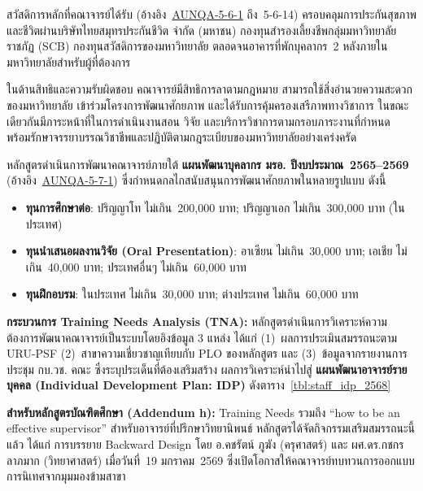 สวัสดิการหลักที่คณาจารย์ได้รับ (อ้างอิง~\hyperlink{ref:AUNQA-5-6-1}{AUNQA-5-6-1} ถึง~5-6-14) ครอบคลุมการประกันสุขภาพและชีวิตผ่านบริษัทไทยสมุทรประกันชีวิต จำกัด (มหาชน) กองทุนสำรองเลี้ยงชีพกลุ่มมหาวิทยาลัยราชภัฏ (SCB) กองทุนสวัสดิการของมหาวิทยาลัย ตลอดจนอาคารที่พักบุคลากร~2 หลังภายในมหาวิทยาลัยสำหรับผู้ที่ต้องการ

ในด้านสิทธิและความรับผิดชอบ คณาจารย์มีสิทธิการลาตามกฎหมาย สามารถใช้สิ่งอำนวยความสะดวกของมหาวิทยาลัย เข้าร่วมโครงการพัฒนาศักยภาพ และได้รับการคุ้มครองเสรีภาพทางวิชาการ ในขณะเดียวกันมีภาระหน้าที่ในการดำเนินงานสอน วิจัย และบริการวิชาการตามกรอบภาระงานที่กำหนด พร้อมรักษาจรรยาบรรณวิชาชีพและปฏิบัติตามกฎระเบียบของมหาวิทยาลัยอย่างเคร่งครัด



หลักสูตรดำเนินการพัฒนาคณาจารย์ภายใต้ \textbf{แผนพัฒนาบุคลากร มรอ. ปีงบประมาณ~2565--2569} (อ้างอิง~\hyperlink{ref:AUNQA-5-7-1}{AUNQA-5-7-1}) ซึ่งกำหนดกลไกสนับสนุนการพัฒนาศักยภาพในหลายรูปแบบ ดังนี้

\begin{itemize}
  \item \textbf{ทุนการศึกษาต่อ}: ปริญญาโท ไม่เกิน~200,000 บาท; ปริญญาเอก ไม่เกิน~300,000 บาท (ในประเทศ)
  \item \textbf{ทุนนำเสนอผลงานวิจัย (Oral Presentation)}: อาเซียน ไม่เกิน~30,000 บาท; เอเชีย ไม่เกิน~40,000 บาท; ประเทศอื่นๆ ไม่เกิน~60,000 บาท
  \item \textbf{ทุนฝึกอบรม}: ในประเทศ ไม่เกิน~30,000 บาท; ต่างประเทศ ไม่เกิน~60,000 บาท
\end{itemize}

\textbf{กระบวนการ Training Needs Analysis (TNA):} หลักสูตรดำเนินการวิเคราะห์ความต้องการพัฒนาคณาจารย์เป็นระบบโดยอิงข้อมูล 3 แหล่ง ได้แก่ (1)~ผลการประเมินสมรรถนะตาม URU-PSF (2)~สาขาความเชี่ยวชาญเทียบกับ PLO ของหลักสูตร และ (3)~ข้อมูลจากรายงานการประชุม กบ.วช. คณะ ซึ่งระบุประเด็นที่ต้องเสริมสร้าง ผลการวิเคราะห์นำไปสู่ \textbf{แผนพัฒนาอาจารย์รายบุคคล (Individual Development Plan: IDP)} ดังตาราง~\ref{tbl:staff_idp_2568}

\textbf{สำหรับหลักสูตรบัณฑิตศึกษา (Addendum h):} Training Needs รวมถึง ``how to be an effective supervisor'' สำหรับอาจารย์ที่ปรึกษาวิทยานิพนธ์ หลักสูตรได้จัดกิจกรรมเสริมสมรรถนะนี้แล้ว ได้แก่ การบรรยาย Backward Design โดย อ.คชรัตน์ ภูฆัง (ครุศาสตร์) และ ผศ.ดร.กชกร ลาภมาก (วิทยาศาสตร์) เมื่อวันที่~19 มกราคม~2569 ซึ่งเปิดโอกาสให้คณาจารย์ทบทวนการออกแบบการนิเทศจากมุมมองข้ามสาขา

